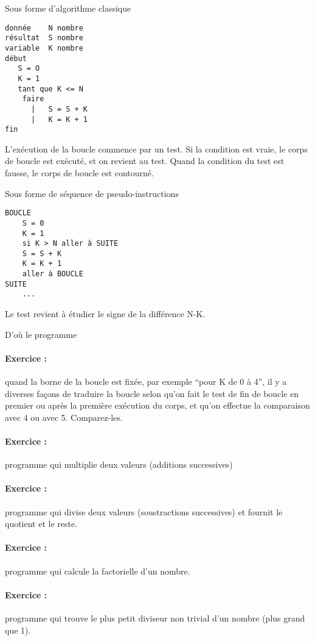 \documentclass[10pt]{article}
\begin{document}
Sous forme d'algorithme classique
\begin{lstlisting}[frame=single]
donnée    N nombre
résultat  S nombre
variable  K nombre
début
   S = O
   K = 1
   tant que K <= N
    faire
      |   S = S + K
      |   K = K + 1
fin
\end{lstlisting}

L'exécution de la boucle commence par un test. Si la condition est vraie,
le corps de boucle est exécuté, et on revient au test. Quand la condition
du test est fausse, le corps de boucle est contourné.


Sous forme de séquence de pseudo-instructions
\begin{lstlisting}[frame=single]
BOUCLE
    S = 0
    K = 1
    si K > N aller à SUITE
    S = S + K
    K = K + 1
    aller à BOUCLE
SUITE
    ...
\end{lstlisting}

Le test revient à étudier le signe de la différence N-K.

D'où le programme


\paragraph{Exercice : } quand la borne de la boucle est fixée, par exemple
``pour K de 0 à 4'', il y a diverses façons de traduire la boucle
selon qu'on fait le test de fin de boucle en premier ou après la
première exécution du corps, et qu'on effectue la comparaison avec 4
ou avec 5. Comparez-les.


\paragraph{Exercice :} programme qui multiplie
deux valeurs (additions successives)

\paragraph{Exercice :} programme qui divise
deux valeurs (soustractions successives) et fournit le quotient et le
reste.

\paragraph{Exercice :} programme qui calcule la factorielle d'un nombre.

\paragraph{Exercice : } programme qui trouve le plus petit diviseur non 
trivial d'un nombre (plus grand que 1).
\end{document}
